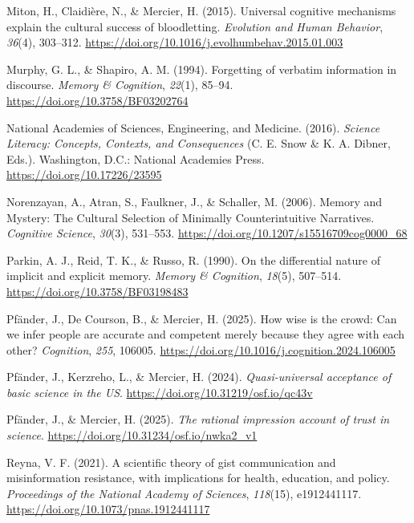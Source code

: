 \documentclass[
  english,
  doc,floatsintext]{apa6}
\newlength{\cslhangindent}
\newenvironment{CSLReferences}[2] %
 {\begin{list}{}{%
  \setlength{\itemindent}{0pt}
  \setlength{\leftmargin}{0pt}
  \setlength{\parsep}{0pt}
  \ifodd #1
   \setlength{\leftmargin}{\cslhangindent}
   \setlength{\itemindent}{-1\cslhangindent}
  \fi
  \setlength{\itemsep}{#2\baselineskip}}}
 {\end{list}}
\begin{document}
\begin{CSLReferences}{1}{0}
Miton, H., Claidière, N., \& Mercier, H. (2015). Universal cognitive mechanisms explain the cultural success of bloodletting. \emph{Evolution and Human Behavior}, \emph{36}(4), 303--312. \url{https://doi.org/10.1016/j.evolhumbehav.2015.01.003}

Murphy, G. L., \& Shapiro, A. M. (1994). Forgetting of verbatim information in discourse. \emph{Memory \& Cognition}, \emph{22}(1), 85--94. \url{https://doi.org/10.3758/BF03202764}

National Academies of Sciences, Engineering, and Medicine. (2016). \emph{Science Literacy: Concepts, Contexts, and Consequences} (C. E. Snow \& K. A. Dibner, Eds.). Washington, D.C.: National Academies Press. \url{https://doi.org/10.17226/23595}

Norenzayan, A., Atran, S., Faulkner, J., \& Schaller, M. (2006). Memory and Mystery: The Cultural Selection of Minimally Counterintuitive Narratives. \emph{Cognitive Science}, \emph{30}(3), 531--553. \url{https://doi.org/10.1207/s15516709cog0000_68}

Parkin, A. J., Reid, T. K., \& Russo, R. (1990). On the differential nature of implicit and explicit memory. \emph{Memory \& Cognition}, \emph{18}(5), 507--514. \url{https://doi.org/10.3758/BF03198483}

Pfänder, J., De Courson, B., \& Mercier, H. (2025). How wise is the crowd: Can we infer people are accurate and competent merely because they agree with each other? \emph{Cognition}, \emph{255}, 106005. \url{https://doi.org/10.1016/j.cognition.2024.106005}

Pfänder, J., Kerzreho, L., \& Mercier, H. (2024). \emph{Quasi-universal acceptance of basic science in the US}. \url{https://doi.org/10.31219/osf.io/qc43v}

Pfänder, J., \& Mercier, H. (2025). \emph{The rational impression account of trust in science}. \url{https://doi.org/10.31234/osf.io/nwka2_v1}

Reyna, V. F. (2021). A scientific theory of gist communication and misinformation resistance, with implications for health, education, and policy. \emph{Proceedings of the National Academy of Sciences}, \emph{118}(15), e1912441117. \url{https://doi.org/10.1073/pnas.1912441117}


\end{CSLReferences}
\end{document}
